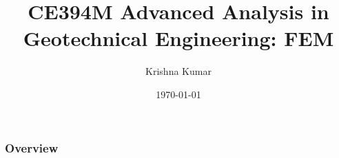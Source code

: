 \documentclass[beamer]{beamer}
\title[CE394M: Intro to FEM]{CE394M Advanced Analysis in Geotechnical Engineering: FEM}
\author{Krishna Kumar} %
\institute[UT Austin] %
{
University of Texas at Austin \\
\medskip
\textit{
  \url{krishnak@utexas.edu}} %
}
\date{\today} %
\begin{document}
\begin{frame}
\titlepage %
\end{frame}

\begin{frame}
 \frametitle{Overview}
 \tableofcontents
\end{frame}


\end{document}
